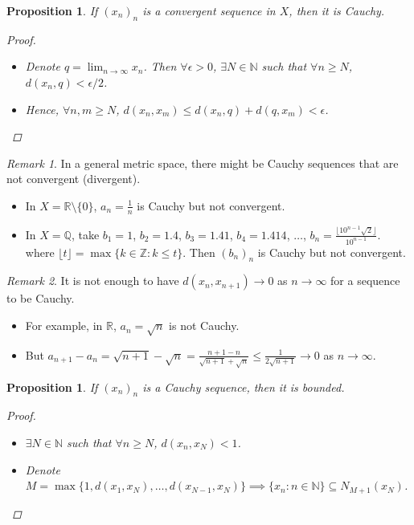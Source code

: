 \documentclass[10pt]{article}
\newcommand{\N}{\mathbb{N}}
\newcommand{\Z}{\mathbb{Z}}
\newcommand{\R}{\mathbb{R}}
\newcommand{\Q}{\mathbb{Q}}
\newtheorem{proposition}[theorem]{Proposition}
\theoremstyle{definition}
\theoremstyle{remark}
\newtheorem*{remark}{Remark}
\begin{document}
\begin{proposition}
    If $(x_n)_n$ is a convergent sequence in $X$, then it is Cauchy.
    \begin{proof}
        \hfill
        \begin{itemize}
            \item Denote $q = \lim_{n \to \infty} x_n$. Then $\forall \epsilon > 0$, $\exists N \in \N$ such that $\forall n \geq N$,
                $d(x_n, q) < \epsilon/2$.
            \item Hence, $\forall n, m \geq N$, $d(x_n, x_m) \leq d(x_n, q) + d(q, x_m) < \epsilon$.
        \end{itemize}
    \end{proof}
\end{proposition}

\begin{remark}
    In a general metric space, there might be Cauchy sequences that are not convergent (divergent).
    \begin{itemize}
        \item In $X = \R \setminus \{0\}$, $a_n = \frac{1}{n}$ is Cauchy but not convergent.
        \item In $X = \Q$, take $b_1 = 1$, $b_2 = 1.4$, $b_3 = 1.41$, $b_4 = 1.414$, $\ldots$, $b_n = \frac{\lfloor 10^{n-1} \sqrt{2} \rfloor}{10^{n-1}}$.
            where $\lfloor t \rfloor = \max \{k \in \Z : k \leq t\}$.
            Then $(b_n)_n$ is Cauchy but not convergent.
    \end{itemize}
\end{remark}

\begin{remark}
    It is not enough to have $d(x_n, x_{n+1}) \to 0$ as $n \to \infty$ for a sequence to be Cauchy.
    \begin{itemize}
        \item
        For example, in $\R$, $a_n = \sqrt{n}$ is not Cauchy.
        \item
        But $a_{n+1} - a_n = \sqrt{n+1} - \sqrt{n} = \frac{n+1 - n}{\sqrt{n+1} + \sqrt{n}}
            \leq \frac{1}{2\sqrt{n+1}} \to 0$ as $n \to \infty$.
    \end{itemize}
\end{remark}

\begin{proposition}
    If $(x_n)_n$ is a Cauchy sequence, then it is bounded.
    \begin{proof}
        \hfill
        \begin{itemize}
            \item $\exists N \in \N$ such that $\forall n \geq N$, $d(x_n, x_N) < 1$.
            \item Denote $M = \max\{1, d(x_1, x_N), \ldots, d(x_{N-1}, x_N)\} \implies \{x_n : n \in \N\} \subseteq N_{M+1}(x_N)$.
        \end{itemize}
    \end{proof}
\end{proposition}
\end{document}

